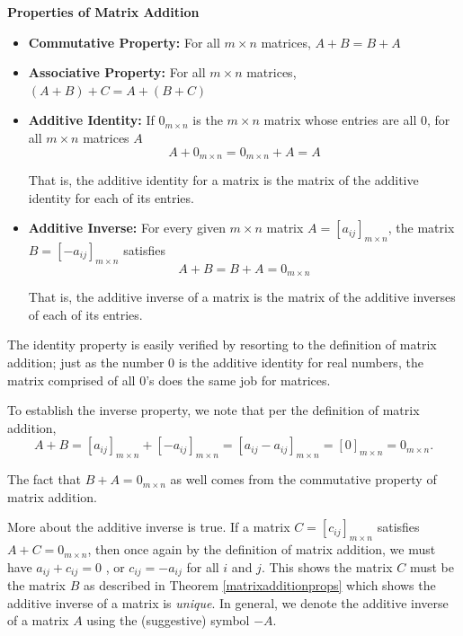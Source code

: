 \documentclass{ximera}
\begin{document}
\smallskip
\begin{theorem} \label{matrixadditionprops}  \textbf{Properties of Matrix Addition} 
\begin{itemize}

\item  \textbf{Commutative Property:}  For all $m \times n$ matrices, $A + B = B + A$
\item  \textbf{Associative Property:}  For all $m \times n$ matrices, $(A + B) + C = A + (B + C)$
\item  \textbf{Additive Identity:}  If $0_{m \times n}$ is the $m \times n$ matrix whose entries are all $0$,  for all $m \times n$ matrices $A$  \[A + 0_{m \times n} = 0_{m \times n} + A = A\]

That is, the additive identity for a matrix  is the matrix of the additive identity for each of its entries.

\item  \textbf{Additive Inverse:}  For every given $m \times n$ matrix $A=\left[a_{ij}\right]_{m \times n}$, the matrix $B = \left[-a_{ij}\right]_{m \times n}$ satisfies  \[A + B = B+ A = 0_{m \times n}\]

That is, the additive inverse of a matrix is the matrix of the additive inverses of each of its entries.  

\end{itemize}
\end{theorem}

\smallskip

The identity property is easily verified by resorting to the definition of matrix addition;  just as the number $0$ is the additive identity for real numbers, the matrix comprised of all $0$'s does the same job for matrices.  

To establish the inverse property,  we note that per the definition of matrix addition,  \[A + B = \left[a_{ij}\right]_{m \times n} + \left[-a_{ij}\right]_{m \times n}  = \left[a_{ij} -a_{ij} \right]_{m \times n} =  \left[ 0  \right]_{m \times n} = 0_{m \times n}.\] 

The fact that $B+A =0_{m \times n}$ as well comes from the commutative property of matrix addition.

More about the additive inverse is true.  If a matrix $C = \left[c_{ij}\right]_{m \times n}$  satisfies $A + C = 0_{m \times n}$,   then once again by the definition of matrix addition, we must have $a_{ij} + c_{ij} = 0$ , or  $c_{ij} = -a_{ij}$ for all $i$ and $j$.  This shows the matrix $C$ must be the matrix $B$ as described in Theorem \ref{matrixadditionprops}  which shows the additive inverse of a matrix  is \textit{unique}. In general, we denote the additive inverse of a matrix $A$ using the (suggestive) symbol  $-A$. 
 
\end{document}

